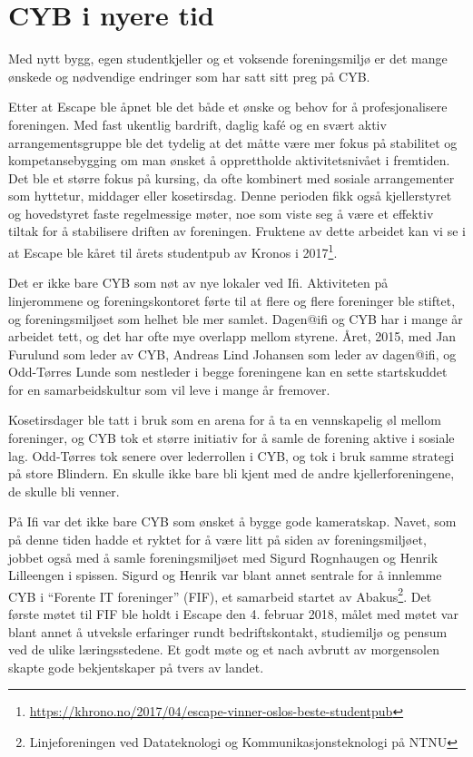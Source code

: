 \chapter{CYB i nyere tid}

\author{Skrevet av Andreas Nyborg Hansen, med hjelp fra Thor Høgås, Odd-Tørres Lunde \& Jan Furulund}

Med nytt bygg, egen studentkjeller og et voksende foreningsmiljø er det mange ønskede og nødvendige endringer som har satt sitt preg på CYB.

Etter at Escape ble åpnet ble det både et ønske og behov for å profesjonalisere foreningen. Med fast ukentlig bardrift, daglig kafé og en svært aktiv arrangementsgruppe ble det tydelig at det måtte være mer fokus på stabilitet og kompetansebygging om man ønsket å opprettholde aktivitetsnivået i fremtiden. Det ble et større fokus på kursing, da ofte kombinert med sosiale arrangementer som hyttetur, middager eller kosetirsdag. Denne perioden fikk også kjellerstyret og hovedstyret faste regelmessige møter, noe som viste seg å være et effektiv tiltak for å stabilisere driften av foreningen. Fruktene av dette arbeidet kan vi se i at Escape ble kåret til årets studentpub av Kronos i 2017\footnote{\url{https://khrono.no/2017/04/escape-vinner-oslos-beste-studentpub}}.

Det er ikke bare CYB som nøt av nye lokaler ved Ifi. Aktiviteten på linjerommene og foreningskontoret førte til at flere og flere foreninger ble stiftet, og foreningsmiljøet som helhet ble mer samlet. Dagen@ifi og CYB har i mange år arbeidet tett, og det har ofte mye overlapp mellom styrene. Året, 2015, med Jan Furulund som leder av CYB, Andreas Lind Johansen som leder av dagen@ifi, og Odd-Tørres Lunde som nestleder i begge foreningene kan en sette startskuddet for en samarbeidskultur som vil leve i mange år fremover. 

Kosetirsdager ble tatt i bruk som en arena for å ta en vennskapelig øl mellom foreninger, og CYB tok et større initiativ for å samle de forening aktive i sosiale lag. Odd-Tørres tok senere over lederrollen i CYB, og tok i bruk samme strategi på store Blindern. En skulle ikke bare bli kjent med de andre kjellerforeningene, de skulle bli venner.  

På Ifi var det ikke bare CYB som ønsket å bygge gode kameratskap. Navet, som på denne tiden hadde et ryktet for å være litt på siden av foreningsmiljøet, jobbet også med å samle foreningsmiljøet med Sigurd Rognhaugen og Henrik Lilleengen i spissen.  Sigurd og Henrik var blant annet sentrale for å innlemme CYB i ``Forente IT foreninger'' (FIF), et samarbeid startet av Abakus\footnote{Linjeforeningen ved Datateknologi og Kommunikasjonsteknologi på NTNU}. Det første møtet til FIF ble holdt i Escape den 4. februar 2018, målet med møtet var blant annet å utveksle erfaringer rundt bedriftskontakt, studiemiljø og pensum ved de ulike læringsstedene. Et godt møte og et nach avbrutt av morgensolen skapte gode bekjentskaper på tvers av landet. 

